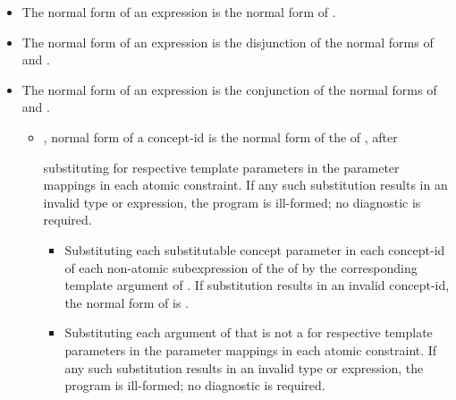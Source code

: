 \documentclass{wg21}
\begin{document}
%
\begin{itemize}
\item
The normal form of an expression  is
the normal form of .

\item
The normal form of an expression  is
the disjunction  of
the normal forms of  and .

\item
The normal form of an expression 
is the conjunction of
the normal forms of  and .

\begin{itemize}
\item
{},  normal form of a concept-id 
is the normal form of the  of ,
after

\begin{removedblock}
 substituting  for
     respective template parameters in the
    parameter mappings in each atomic constraint.
    If any such substitution results in an invalid type or expression,
    the program is ill-formed; no diagnostic is required.
\end{removedblock}
\begin{addedblock}
\begin{itemize}
\item Substituting each substitutable concept parameter in each concept-id  of each non-atomic subexpression of the  of  by the corresponding template argument of . If substitution  results in an invalid concept-id, the normal form of  is .
\item Substituting each argument  of  that is not a  for
 respective template parameters in the
parameter mappings in each atomic constraint.
If any such substitution results in an invalid type or expression,
the program is ill-formed; no diagnostic is required.
\end{itemize}
\end{addedblock}


\end{itemize}
\end{itemize}
\end{document}
